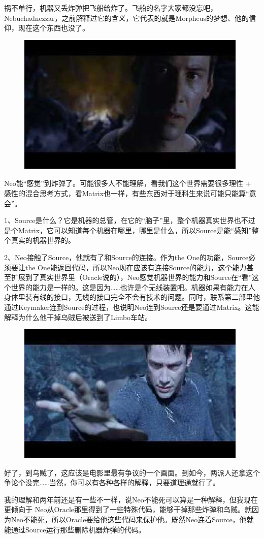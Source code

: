 \documentclass{ctexart}
\begin{document}
祸不单行，机器又丢炸弹把飞船给炸了。飞船的名字大家都没忘吧，Nebuchadnezzar，之前解释过它的含义，它代表的就是Morpheus的梦想、他的信仰，现在这个东西也没了。

\begin{figure}[htb]
\centering
\includegraphics[width=0.5\linewidth]{fig/read_reloaded-176}
\end{figure}

Neo能“感觉”到炸弹了。可能很多人不能理解，看我们这个世界需要很多理性 + 感性的混合思考方式，看Matrix也一样，有些东西对于理科生来说可能只能算“意会”。

1、Source是什么？它是机器的总管，在它的“脑子”里，整个机器真实世界也不过是个Matrix，它可以知道每个机器在哪里，哪里是什么，所以Source是能“感知”整个真实的机器世界的。

2、Neo接触了Source，他就有了和Source的连接。作为the One的功能，Source必须要让the One能返回代码，所以Neo现在应该有连接Source的能力，这个能力甚至扩展到了真实世界里（Oracle说的），Neo感觉机器世界的能力和Source在“看”这个世界的能力是一样的。这是因为……也许是个无线装置吧。机器如果有能力在人身体里装有线的接口，无线的接口完全不会有技术的问题。同时，联系第二部里他通过Keymaker连到Source的过程，也说明Neo连到Source还是要通过Matrix。这能解释为什么他干掉乌贼后被送到了Limbo车站。

\begin{figure}[htb]
\centering
\includegraphics[width=0.5\linewidth]{fig/read_reloaded-177}
\end{figure}

好了，到乌贼了，这应该是电影里最有争议的一个画面。到如今，两派人还拿这个争论个没完……当然，你可以有各种各样的解释，只要道理通就行了。

我的理解和两年前还是有一些不一样，说Neo不能死可以算是一种解释，但我现在更倾向于 Neo从Oracle那里得到了一些特殊代码，能够干掉那些炸弹和乌贼。就因为Neo不能死，所以Oracle要给他这些代码来保护他。既然Neo连着Source，他就能通过Source运行那些删除机器炸弹的代码。
\end{document}
